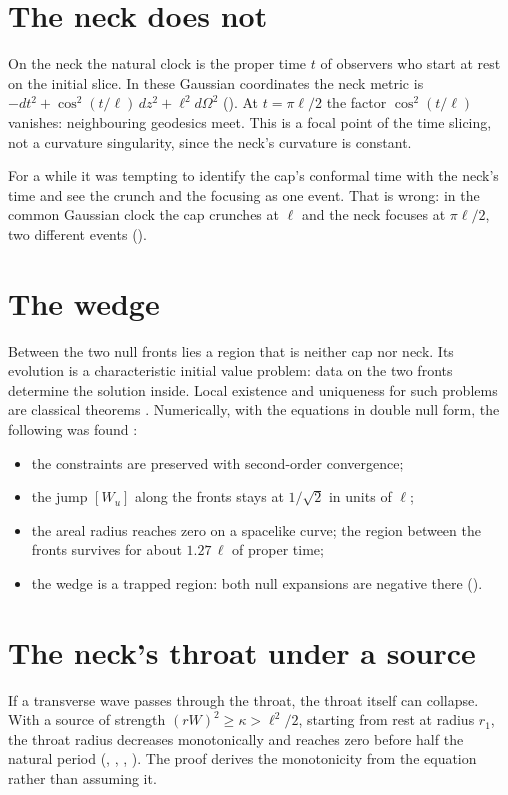 \section{The neck does not}

On the neck the natural clock is the proper time $t$ of observers who start at rest on the initial slice. In these Gaussian coordinates the neck metric is $-dt^2+\cos^2(t/\ell)\,dz^2+\ell^2d\Omega^2$ (). At $t=\pi\ell/2$ the factor $\cos^2(t/\ell)$ vanishes: neighbouring geodesics meet. This is a focal point of the time slicing, not a curvature singularity, since the neck's curvature is constant.

For a while it was tempting to identify the cap's conformal time with the neck's time and see the crunch and the focusing as one event. That is wrong: in the common Gaussian clock the cap crunches at $\ell$ and the neck focuses at $\pi\ell/2$, two different events (). \negative

\section{The wedge}

Between the two null fronts lies a region that is neither cap nor neck. Its evolution is a characteristic initial value problem: data on the two fronts determine the solution inside. Local existence and uniqueness for such problems are classical theorems \external. Numerically, with the equations in double null form, the following was found \numerical:
\begin{itemize}[leftmargin=*]
\item the constraints are preserved with second-order convergence;
\item the jump $[W_u]$ along the fronts stays at $1/\sqrt2$ in units of $\ell$;
\item the areal radius reaches zero on a spacelike curve; the region between the fronts survives for about $1.27\,\ell$ of proper time;
\item the wedge is a trapped region: both null expansions are negative there ().
\end{itemize}

\section{The neck's throat under a source}

If a transverse wave passes through the throat, the throat itself can collapse. With a source of strength $(rW)^2\ge\kappa>\ell^2/2$, starting from rest at radius $r_1$, the throat radius decreases monotonically and reaches zero before half the natural period (, , , ). The proof derives the monotonicity from the equation rather than assuming it.


